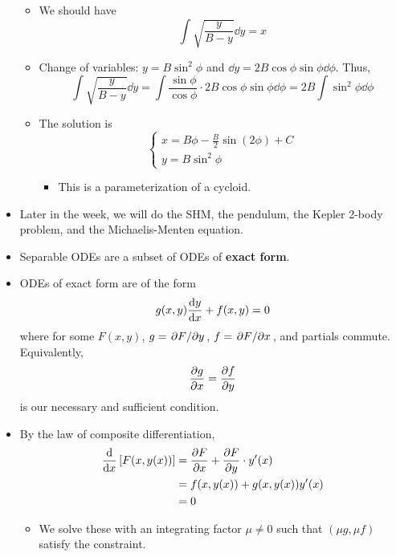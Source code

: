 \documentclass[../notes.tex]{subfiles}
\begin{document}
\begin{itemize}
\begin{itemize}
        \item We should have
        \begin{equation*}
            \int\sqrt{\frac{y}{B-y}}\dd{y} = x
        \end{equation*}
        \item Change of variables: $y=B\sin^2\phi$ and $\dd{y}=2B\cos\phi\sin\phi\dd{\phi}$. Thus,
        \begin{equation*}
            \int\sqrt{\frac{y}{B-y}}\dd{y} = \int\frac{\sin\phi}{\cos\phi}\cdot 2B\cos\phi\sin\phi\dd{\phi}
            = 2B\int\sin^2\phi\dd{\phi}
        \end{equation*}
        \item The solution is
        \begin{equation*}
            \begin{cases}
                x = B\phi-\frac{B}{2}\sin(2\phi)+C\\
                y = B\sin^2\phi
            \end{cases}
        \end{equation*}
        \begin{itemize}
            \item This is a parameterization of a cycloid.
        \end{itemize}
    \end{itemize}
    \item Later in the week, we will do the SHM, the pendulum, the Kepler 2-body problem, and the Michaelis-Menten equation.
    \item Separable ODEs are a subset of ODEs of \textbf{exact form}.
    \item ODEs of exact form are of the form
    \begin{equation*}
        g(x,y)\dv{y}{x}+f(x,y) = 0
    \end{equation*}
    where for some $F(x,y)$, $g=\pdv*{F}{y}$, $f=\pdv*{F}{x}$, and partials commute. Equivalently,
    \begin{equation*}
        \pdv{g}{x} = \pdv{f}{y}
    \end{equation*}
    is our necessary and sufficient condition.
    \item By the law of composite differentiation,
    \begin{align*}
        \dv{x}\left[ F(x,y(x)) \right] &= \pdv{F}{x}(x,y(x))+\pdv{F}{y}(x,y(x))\cdot y'(x)\\
        &= f(x,y(x))+g(x,y(x))y'(x)\\
        &= 0
    \end{align*}
    \begin{itemize}
        \item We solve these with an integrating factor $\mu\neq 0$ such that $(\mu g,\mu f)$ satisfy the constraint.
    \end{itemize}
\end{itemize}
\end{document}
